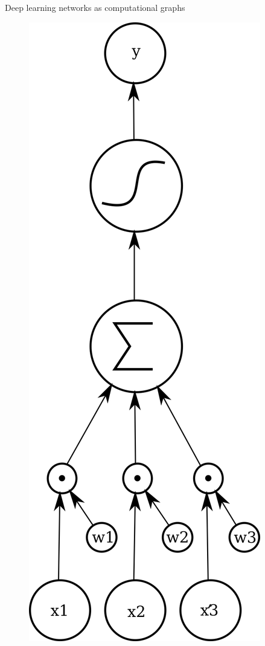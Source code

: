 \documentclass[10pt]{beamer}
\begin{document}
\begin{frame}{Deep learning networks as computational graphs}
{\begin{figure}
		\includegraphics[scale=0.4]{flowgraph1}
	\end{figure}}
\end{frame}
\end{document}
